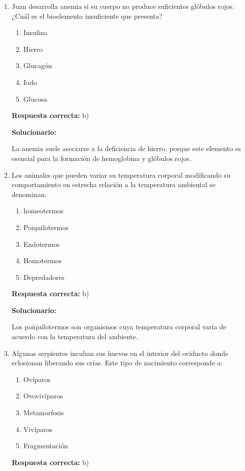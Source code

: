 \begin{enumerate}[resume]
	
	\item Juan desarrolla anemia si su cuerpo no produce suficientes glóbulos rojos. ¿Cuál es el bioelemento insuficiente que presenta?
	\begin{enumerate}[label=\alph*)]
		\item Insulina
		\item Hierro
		\item Glucagón
		\item Iodo
		\item Glucosa
	\end{enumerate}
	\textbf{Respuesta correcta:} b)
	
	\vspace{2mm}
	\textbf{Solucionario:}
	
	La anemia suele asociarse a la deficiencia de hierro, porque este elemento es esencial para la formación de hemoglobina y glóbulos rojos.
	
	\vspace{6mm}
	
	\item Los animales que pueden variar su temperatura corporal modificando su comportamiento en estrecha relación a la temperatura ambiental se denominan:
	\begin{enumerate}[label=\alph*)]
		\item homeotermos
		\item Poiquilotermos
		\item Endotermos
		\item Homotermos
		\item Depredadores
	\end{enumerate}
	\textbf{Respuesta correcta:} b)
	
	\vspace{2mm}
	\textbf{Solucionario:}
	
	Los poiquilotermos son organismos cuya temperatura corporal varía de acuerdo con la temperatura del ambiente.
	
	\vspace{6mm}
	
	\item Algunas serpientes incuban sus huevos en el interior del oviducto donde eclosionan liberando sus crías. Este tipo de nacimiento corresponde a:
	\begin{enumerate}[label=\alph*)]
		\item Ovíparos
		\item Ovovivíparos
		\item Metamorfosis
		\item Vivíparos
		\item Fragmentación
	\end{enumerate}
	\textbf{Respuesta correcta:} b)
	

\end{enumerate}

